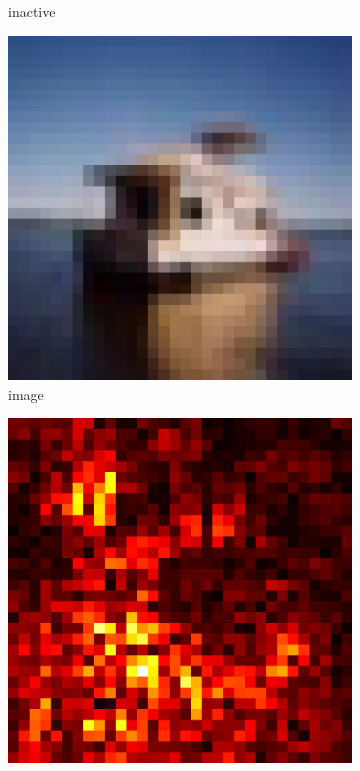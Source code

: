\documentclass[preprint,12pt]{elsarticle}
\begin{document}
\begin{figure}
\begin{subfigure}{0.14\textwidth}
        \caption{inactive}
    \end{subfigure}
    \hfill
    \begin{subfigure}{0.14\linewidth}
        \centering
        \includegraphics[width=\linewidth]{../visualizations/examples/cifar10/cnn/images/8.png}
        \caption{image}
    \end{subfigure}
    \hfill
    \begin{subfigure}{0.14\linewidth}
        \centering
        \includegraphics[width=\linewidth]{../visualizations/examples/cifar10/cnn/saliency_map/8.png}

\end{subfigure}
\end{figure}
\end{document}
